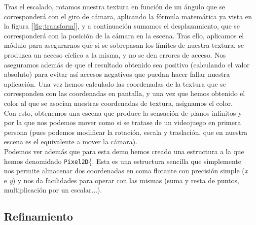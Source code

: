 Tras el escalado, rotamos nuestra textura en función de un ángulo que se corresponderá con el giro de cámara, aplicando la fórmula matemática ya vista en la figura [\ref{fig:transform}], y a continuación sumamos el desplazamiento, que se corresponderá con la posición de la cámara en la escena. Tras ello, aplicamos el módulo para asegurarnos que si se sobrepasan los límites de nuestra textura, se produzca un acceso cíclico a la misma, y no se den errores de acceso. Nos aseguramos además de que el resultado obtenido sea positivo (calculando el valor absoluto) para evitar así accesos negativos que puedan hacer fallar nuestra aplicación. Una vez hemos calculado las coordenadas de la textura que se corresponden con las coordenadas en pantalla, y una vez que hemos obtenido el color al que se asocian nuestras coordenadas de textura, asignamos el color.\\

Con esto, obtenemos una escena que produce la sensación de planos infinitos y por la que nos podemos mover como si se tratase de un videojuego en primera persona (pues podemos modificar la rotación, escala y traslación, que en nuestra escena es el equivalente a mover la cámara).\\

Podemos ver además que para esta demo hemos creado una estructura a la que hemos denomidado \lstinline{Pixel2D}\{. Esta es una estructura sencilla que simplemente nos permite almacenar dos coordenadas en coma flotante con precisión simple (\emph{x} e \emph{y}) y nos da facilidades para operar con las mismas (suma y resta de puntos, multiplicación por un escalar...).

\subsection{Refinamiento}

